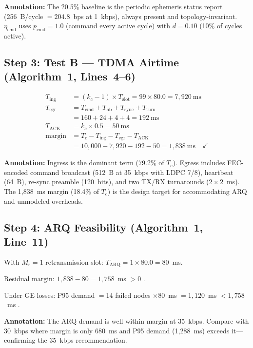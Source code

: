 \documentclass[journal]{IEEEtran}
\begin{document}
\textbf{Annotation:} The 20.5\% baseline is the periodic ephemeris status report (256~B/cycle $= 204.8$~bps at 1~kbps), always present and topology-invariant. $\eta_{\text{cmd}}$ uses $p_{\text{cmd}} = 1.0$ (command every active cycle) with $d = 0.10$ (10\% of cycles active).

\subsection{Step 3: Test B --- TDMA Airtime (Algorithm~1, Lines~4--6)}

\begin{align*}
    T_{\text{ing}} &= (k_c - 1) \times T_{\text{slot}} = 99 \times 80.0 = 7{,}920~\text{ms} \\
    T_{\text{egr}} &= T_{\text{cmd}} + T_{\text{hb}} + T_{\text{sync}} + T_{\text{turn}} \\
                   &= 160 + 24 + 4 + 4 = 192~\text{ms} \\
    T_{\text{ACK}} &= k_c \times 0.5 = 50~\text{ms} \\
    \text{margin} &= T_c - T_{\text{ing}} - T_{\text{egr}} - T_{\text{ACK}} \\
                  &= 10{,}000 - 7{,}920 - 192 - 50 = 1{,}838~\text{ms} \quad \checkmark
\end{align*}

\textbf{Annotation:} Ingress is the dominant term (79.2\% of $T_c$). Egress includes FEC-encoded command broadcast (512~B at 35~kbps with LDPC 7/8), heartbeat (64~B), re-sync preamble (120~bits), and two TX/RX turnarounds ($2 \times 2$~ms). The 1,838~ms margin (18.4\% of $T_c$) is the design target for accommodating ARQ and unmodeled overheads.

\subsection{Step 4: ARQ Feasibility (Algorithm~1, Line~11)}

With $M_r = 1$ retransmission slot: $T_{\text{ARQ}} = 1 \times 80.0 = 80$~ms.

Residual margin: $1{,}838 - 80 = 1{,}758$~ms $> 0$ \checkmark.

Under GE losses: P95 demand $= 14$ failed nodes $\times 80$~ms $= 1{,}120$~ms $< 1{,}758$~ms \checkmark.

\textbf{Annotation:} The ARQ demand is well within margin at 35~kbps. Compare with 30~kbps where margin is only 680~ms and P95 demand (1,288~ms) exceeds it---confirming the 35~kbps recommendation.
\end{document}
